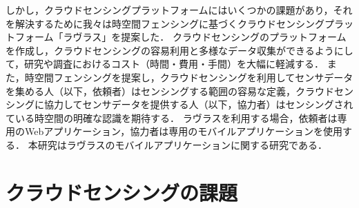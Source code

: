 しかし，クラウドセンシングプラットフォームにはいくつかの課題があり，それを解決するために我々は時空間フェンシングに基づくクラウドセンシングプラットフォーム「ラヴラス」を提案した．
クラウドセンシングのプラットフォームを作成し，クラウドセンシングの容易利用と多様なデータ収集ができるようにして，研究や調査におけるコスト（時間・費用・手間）を大幅に軽減する．
また，時空間フェンシングを提案し，クラウドセンシングを利用してセンサデータを集める人（以下，依頼者）はセンシングする範囲の容易な定義，クラウドセンシングに協力してセンサデータを提供する人（以下，協力者）はセンシングされている時空間の明確な認識を期待する．
ラヴラスを利用する場合，依頼者は専用のWebアプリケーション，協力者は専用のモバイルアプリケーションを使用する．
本研究はラヴラスのモバイルアプリケーションに関する研究である．



\section{クラウドセンシングの課題}


